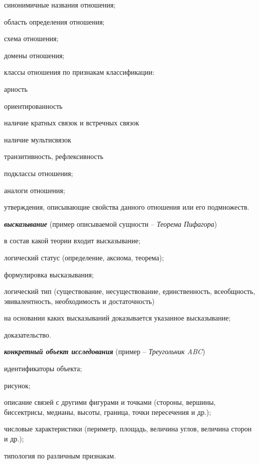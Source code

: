 \begin{textitemize}
	\item синонимичные названия отношения;
	\item область определения отношения;
	\item схема отношения;
	\item домены отношения;
	\item классы отношения по признакам классификации:
	\begin{textitemize}
		\item арность
		\item ориентированность
		\item наличие кратных связок и встречных связок
		\item наличие мультисвязок
		\item транзитивность, рефлексивность
	\end{textitemize}
	\item подклассы отношения;
	\item аналоги отношения;
	\item утверждения, описывающие свойства данного отношения или его подмножеств.
\end{textitemize}

\textbf{\textit{высказывание}} (пример описываемой сущности -- \textit{Теорема Пифагора})

\begin{textitemize}
	\item в состав какой теории входит высказывание;
	\item логический статус (определение, аксиома, теорема);
	\item формулировка высказывания;
	\item логический тип (существование, несуществование, единственность, всеобщность, эвивалентность, необходимость и достаточность)
	\item на основании каких высказываний доказывается указанное высказывание;
	\item доказательство.
\end{textitemize}

\textbf{\textit{конкретный объект исследования}} (пример -- \textit{Треугольник ABC})

\begin{textitemize}
	\item идентификаторы объекта;
	\item рисунок;
	\item описание связей с другими фигурами и точками (стороны, вершины, биссектрисы, медианы, высоты, граница, точки пересечения и др.);
	\item числовые характеристики (периметр, площадь, величина углов, величина сторон и др.);
	\item типология по различным признакам.
\end{textitemize}

